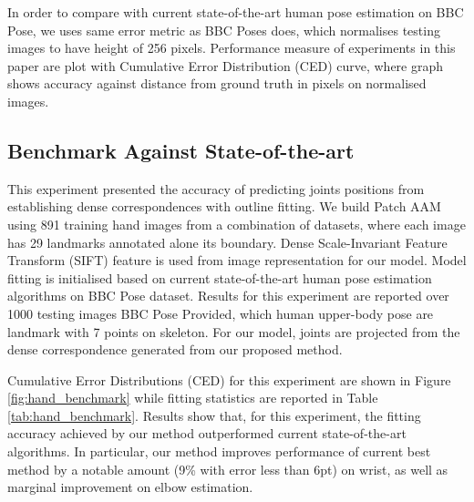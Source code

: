 In order to compare with current state-of-the-art human pose estimation on BBC Pose, we uses same error metric as BBC Poses does, which normalises testing images to have height of 256 pixels. Performance measure of experiments in this paper are plot with Cumulative Error Distribution (CED) curve, where graph shows accuracy against distance from ground truth in pixels on normalised images.

\subsection{Benchmark Against State-of-the-art}
\label{exp:benchmark}
This experiment presented the accuracy of predicting joints positions from establishing dense correspondences with outline fitting. We build Patch AAM using 891 training hand images from a combination of datasets, where each image has 29 landmarks annotated alone its boundary. Dense Scale-Invariant Feature Transform (SIFT)\cite{PoseletsICCV09} feature is used from image representation for our model. Model fitting is initialised based on current state-of-the-art human pose estimation algorithms on BBC Pose dataset. Results for this experiment are reported over 1000 testing images BBC Pose Provided, which human upper-body pose are landmark with 7 points on skeleton. For our model, joints are projected from the dense correspondence generated from our proposed method.

Cumulative Error Distributions (CED) for this experiment are shown in Figure \ref{fig:hand_benchmark} while fitting statistics are reported in Table \ref{tab:hand_benchmark}. Results show that, for this experiment, the fitting accuracy achieved by our method outperformed current state-of-the-art algorithms. In particular, our method improves performance of current best method \cite{pfister2015flowing} by a notable amount (9\% with error less than 6pt) on wrist, as well as marginal improvement on elbow estimation.


